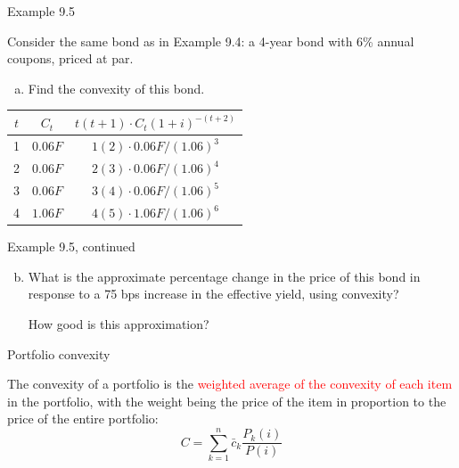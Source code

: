 \documentclass{beamer}
\begin{document}
\begin{frame}{Example 9.5}

Consider the same bond as in Example 9.4: a 4-year bond with 6\% annual coupons, priced at par.
\begin{enumerate}[a)]
\item Find the convexity of this bond.
\end{enumerate}

\begin{center}
\renewcommand{\arraystretch}{1.3}
\begin{tabular}{ccc}
\toprule
$t$ & $C_t$ & $t(t+1) \cdot C_t (1+i)^{-(t+2)}$ \\
\midrule
1 & $0.06F$ & $1(2) \cdot 0.06F/(1.06)^3$ \\
2 & $0.06F$ & $2(3) \cdot 0.06F/(1.06)^4$ \\
3 & $0.06F$ & $3(4) \cdot 0.06F/(1.06)^5$ \\
4 & $1.06F$ & $4(5) \cdot 1.06F/(1.06)^6$ \\
\bottomrule
\end{tabular}
\end{center}

\vfill
\end{frame}

\begin{frame}{Example 9.5, continued}

\begin{enumerate}[a)]
\setcounter{enumi}{1}
\item What is the approximate percentage change in the price of this bond in response to a 75 bps increase in the effective yield, using convexity?

\vspace{8em}
How good is this approximation?
\end{enumerate}

\vfill
\end{frame}

\begin{frame}{Portfolio convexity}

The convexity of a portfolio is the \textcolor{red}{weighted average of the convexity of each item} in the portfolio, with the weight being the price of the item in proportion to the price of the entire portfolio:
\[
C = \sum_{k=1}^{n} \bar{c}_k \frac{P_k(i)}{P(i)}
\]

\end{frame}

\end{document}
